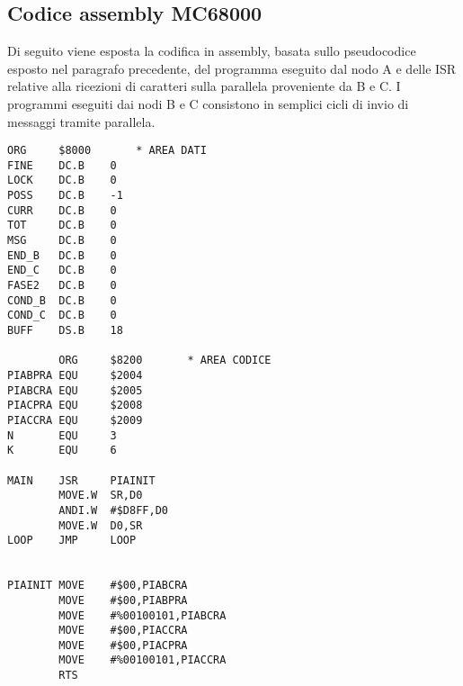 \documentclass{article}
\begin{document}
\subsection{Codice assembly MC68000}
Di seguito viene esposta la codifica in assembly, basata sullo pseudocodice esposto nel paragrafo precedente, del programma eseguito dal nodo A e delle ISR relative alla ricezioni di caratteri sulla parallela proveniente da B e C. I programmi eseguiti dai nodi B e C consistono in semplici cicli di invio di messaggi tramite parallela. 
\vspace{2\baselineskip}

\begin{lstlisting}[language=RISCAsm]
        ORG     $8000       * AREA DATI
FINE    DC.B    0
LOCK    DC.B    0
POSS    DC.B    -1
CURR    DC.B    0
TOT     DC.B    0
MSG     DC.B    0 
END_B   DC.B    0 
END_C   DC.B    0 
FASE2   DC.B    0
COND_B  DC.B    0
COND_C  DC.B    0
BUFF    DS.B    18

        ORG     $8200       * AREA CODICE
PIABPRA EQU     $2004
PIABCRA EQU     $2005
PIACPRA EQU     $2008
PIACCRA EQU     $2009
N       EQU     3
K       EQU     6

MAIN    JSR     PIAINIT
        MOVE.W  SR,D0 
        ANDI.W  #$D8FF,D0
        MOVE.W  D0,SR 
LOOP    JMP     LOOP 


PIAINIT MOVE    #$00,PIABCRA 
        MOVE    #$00,PIABPRA 
        MOVE    #%00100101,PIABCRA 
        MOVE    #$00,PIACCRA 
        MOVE    #$00,PIACPRA 
        MOVE    #%00100101,PIACCRA
        RTS  


\end{lstlisting}
\end{document}
